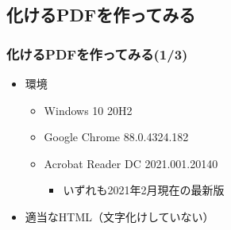 \subsection{化けるPDFを作ってみる}
\begin{frame}\frametitle{化けるPDFを作ってみる(1/3)}
  \begin{itemize}
  \item 環境
    \begin{itemize}
    \item Windows 10 20H2
    \item Google Chrome 88.0.4324.182
    \item Acrobat Reader DC 2021.001.20140
      \begin{itemize}
      \item いずれも2021年2月現在の最新版
      \end{itemize}
    \end{itemize}
  \item 適当なHTML（文字化けしていない）
  \end{itemize}
  \centering
  \tiny
  \tcbox[left=0mm,right=0mm,top=0mm,bottom=0mm,title=foobar.html,%
    colframe=structure.fg,colbacktitle=structure.fg,colback=structure.bg]
        {}
\end{frame}

